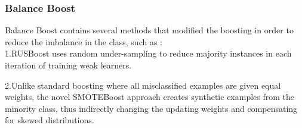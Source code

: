  
\subsubsection{Balance Boost} 
Balance Boost contains several methods that modified the boosting in order to reduce the imbalance in the class, such as : \noindent \\

1.RUSBoost uses random under-sampling to reduce majority instances in each iteration of training weak learners.

2.Unlike standard boosting where all misclassified examples are given equal weights, the novel SMOTEBoost approach creates synthetic examples from the minority class, thus indirectly changing the updating weights and compensating for skewed distributions.
















